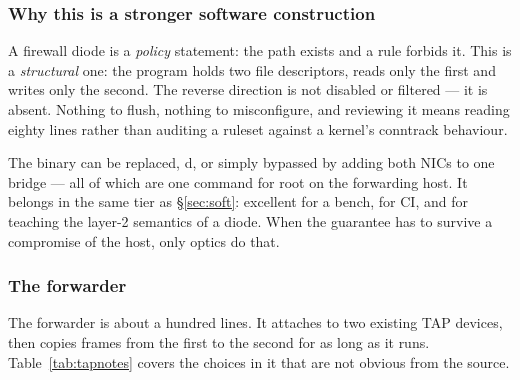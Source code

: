 \documentclass[11pt,a4paper]{article}
\begin{document}
\subsubsection{Why this is a stronger software construction}

A firewall diode is a \emph{policy} statement: the path exists and a rule
forbids it. This is a \emph{structural} one: the program holds two file
descriptors, reads only the first and writes only the second. The reverse
direction is not disabled or filtered --- it is absent. Nothing to flush,
nothing to misconfigure, and reviewing it means reading eighty lines rather
than auditing a ruleset against a kernel's conntrack behaviour.

\begin{labbox}
The binary can be replaced, d, or simply bypassed by adding both
NICs to one bridge --- all of which are one command for root on the forwarding
host. It belongs in the same tier as \S\ref{sec:soft}: excellent for a bench,
for CI, and for teaching the layer-2 semantics of a diode. When the guarantee
has to survive a compromise of the host, only optics do that.
\end{labbox}

\subsubsection{The forwarder}

The forwarder is about a hundred lines. It attaches to two existing TAP
devices, then copies frames from the first to the second for as long as it
runs. Table~\ref{tab:tapnotes} covers the choices in it that are not obvious
from the source.
\end{document}
